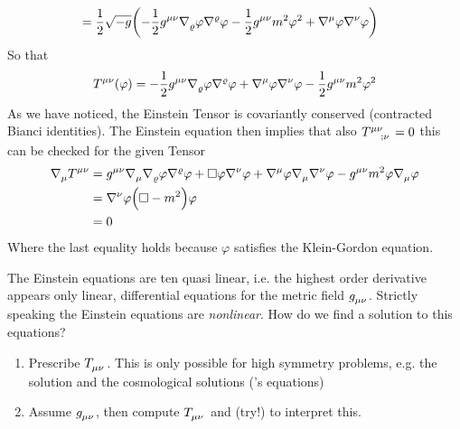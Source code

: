 \begin{example}
\begin{equation}
\begin{split}
&=\frac{1}{2}\sqrt{-g}\left(-\frac{1}{2}\tensor{g}{^\mu^\nu}\tensor{\nabla}{_\varrho}\varphi\tensor{\nabla}{^\varrho}\varphi-\frac{1}{2}\tensor{g}{^\mu^\nu}m^2\varphi^2
+\tensor{\nabla}{^\mu}\varphi\tensor{\nabla}{^\nu}\varphi\right)
\end{split}
\end{equation}
So that
\begin{equation}
\tensor{T}{^\mu^\nu}(\varphi)
=-\frac{1}{2}\tensor{g}{^\mu^\nu}\tensor{\nabla}{_\varrho}\varphi\tensor{\nabla}{^\varrho}\varphi
+\tensor{\nabla}{^\mu}\varphi\tensor{\nabla}{^\nu}\varphi
-\frac{1}{2}\tensor{g}{^\mu^\nu}m^2\varphi^2
\end{equation}
As we have noticed, the Einstein Tensor is covariantly conserved (contracted
Bianci identities). The Einstein equation then implies that also
$\tensor{T}{^\mu^\nu_{;\nu}}=0$ this can be checked for the given Tensor
\begin{equation}
\begin{split}
\tensor{\nabla}{_\mu}\tensor{T}{^\mu^\nu}
&=\tensor{g}{^\mu^\nu}\tensor{\nabla}{_\mu}\tensor{\nabla}{_\varrho}\varphi\tensor{\nabla}{^\varrho}\varphi+\square\varphi\tensor{\nabla}{^\nu}\varphi+\tensor{\nabla}{^\mu}\varphi\tensor{\nabla}{_\mu}\tensor{\nabla}{^\nu}\varphi
-\tensor{g}{^\mu^\nu}m^2\varphi\tensor{\nabla}{_\mu}\varphi\\
&=\tensor{\nabla}{^\nu}\varphi\left(\square-m^2\right)\varphi\\
&=0
\end{split}
\end{equation}
Where the last equality holds because $\varphi$ satisfies the Klein-Gordon
equation. 
\end{example}
The Einstein equations are ten quasi linear, i.e. the highest order
derivative appears only linear, differential equations for the metric field
$\tensor{g}{_\mu_\nu}$. Strictly speaking the Einstein equations are
\emph{nonlinear}.
How do we find a solution to this equations?
\begin{enumerate}
  \item Prescribe $\tensor{T}{_\mu_\nu}$. This is only possible for high
  symmetry problems, e.g. the  solution and the cosmological
  solutions ('s equations)
  \item Assume $\tensor{g}{_\mu_\nu}$, then compute $\tensor{T}{_\mu_\nu}$ and
  (try!) to interpret this.
\end{enumerate}
